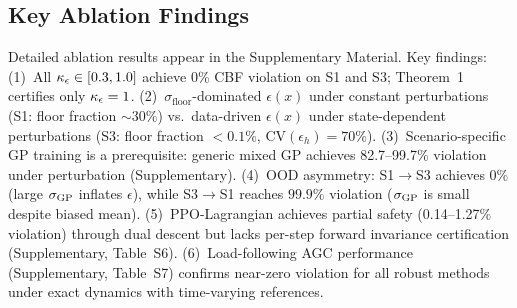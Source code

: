 \subsection{Key Ablation Findings}

Detailed ablation results appear in the Supplementary Material. Key findings: (1)~All $\kappa_\epsilon \in [0.3, 1.0]$ achieve 0\% CBF violation on S1 and S3; Theorem~1 certifies only $\kappa_\epsilon = 1$. (2)~$\sigma_{\mathrm{floor}}$-dominated $\epsilon(x)$ under constant perturbations (S1: floor fraction ${\sim}30\%$) vs.\ data-driven $\epsilon(x)$ under state-dependent perturbations (S3: floor fraction $<0.1\%$, $\mathrm{CV}(\epsilon_h)=70\%$). (3)~Scenario-specific GP training is a prerequisite: generic mixed GP achieves 82.7--99.7\% violation under perturbation (Supplementary). (4)~OOD asymmetry: S1$\to$S3 achieves 0\% (large $\sigma_{\mathrm{GP}}$ inflates $\epsilon$), while S3$\to$S1 reaches $99.9\%$ violation ($\sigma_{\mathrm{GP}}$ is small despite biased mean). (5)~PPO-Lagrangian achieves partial safety (0.14--1.27\% violation) through dual descent but lacks per-step forward invariance certification (Supplementary, Table~S6). (6)~Load-following AGC performance (Supplementary, Table~S7) confirms near-zero violation for all robust methods under exact dynamics with time-varying references.
